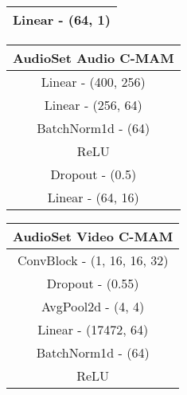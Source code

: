 \begin{table}[h!]
\begin{minipage}[t]{0.4\textwidth}
\begin{tabular}{clllllllllll}
            \multicolumn{12}{c}{Linear - (64, 1)}                                              \\ \hline
            \end{tabular}
    \end{minipage}%
    \hfill
    \begin{minipage}[t]{0.24\textwidth}
        \centering
        \vspace{0pt} %
        \begin{tabular}{|clllll|}
            \hline
            \multicolumn{6}{c}{\textbf{AudioSet Audio C-MAM}} \\ \hline
            \multicolumn{6}{c}{Linear - (400, 256)}                            \\ \hline
            \multicolumn{6}{c}{Linear - (256, 64)}                            \\ \hline
            \multicolumn{6}{c}{BatchNorm1d - (64)}                       \\ \hline
            \multicolumn{6}{c}{ReLU}                              \\ \hline
            \multicolumn{6}{c}{Dropout - (0.5)}                           \\ \hline
            \multicolumn{6}{c}{Linear - (64, 16)}                            \\ \hline
            \end{tabular}
    \end{minipage}%
    \hfill
    \begin{minipage}[t]{0.24\textwidth}
    \centering
    \vspace{0pt} %
        \begin{tabular}{|clllll|}
        \hline
        \multicolumn{6}{c}{\textbf{AudioSet Video C-MAM}} \\ \hline
        \multicolumn{6}{c}{ConvBlock - (1, 16, 16, 32)}                     \\ \hline
        \multicolumn{6}{c}{Dropout - (0.55)}                       \\ \hline
        \multicolumn{6}{c}{AvgPool2d - (4, 4)}                     \\ \hline
        \multicolumn{6}{c}{Linear - (17472, 64)}                        \\ \hline
        \multicolumn{6}{c}{BatchNorm1d - (64)}                   \\ \hline
        \multicolumn{6}{c}{ReLU}                          \\ \hline

\end{tabular}
\end{minipage}
\end{table}
